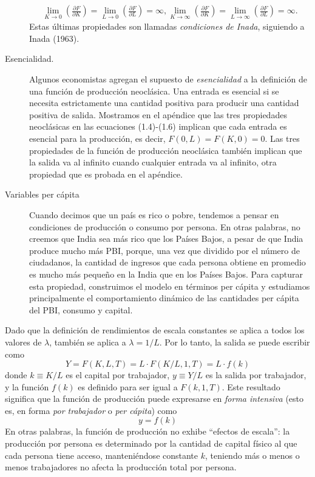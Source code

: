 \begin{description}
\begin{equation}
\begin{split}
\lim\limits_{K\to0}\left(\frac{\partial F}{\partial K}\right)=\lim\limits_{L\to0}\left(\frac{\partial F}{\partial L}\right)=\infty,
\lim\limits_{K\to\infty}\left(\frac{\partial F}{\partial K}\right)=\lim\limits_{L\to\infty}\left(\frac{\partial F}{\partial L}\right)=\infty.
\end{split}
\end{equation}
Estas últimas propiedades son llamadas \emph{condiciones de Inada}, siguiendo a Inada (1963).
\item[Esencialidad.] Algunos economistas agregan el supuesto de \emph{esencialidad} a la definición de una función de producción neoclásica. Una entrada es esencial si se necesita estrictamente una cantidad positiva para producir una cantidad positiva de salida. Mostramos en el apéndice que las tres propiedades neoclásicas en las ecuaciones (1.4)-(1.6) implican que cada entrada es esencial para la producción, es decir, $F\left(0,L\right)=F\left(K,0\right)=0$. Las tres propiedades de la función de producción neoclásica también implican que la salida va al infinito cuando cualquier entrada va al infinito, otra propiedad que es probada en el apéndice.
\end{description}

\begin{description}
	\item[Variables per cápita] Cuando decimos que un país es rico o pobre, tendemos a pensar en condiciones de producción o consumo por persona. En otras palabras, no creemos que India sea más rico que los Países Bajos, a pesar de que India produce mucho más PBI, porque, una vez que dividido por el número de ciudadanos, la cantidad de ingresos que cada persona obtiene en promedio es mucho más pequeño en la India que en los Países Bajos. Para capturar esta propiedad, construimos el modelo en términos per cápita y estudiamos principalmente el comportamiento dinámico de las cantidades per cápita del PBI, consumo y capital.
\end{description}

Dado que la definición de rendimientos de escala constantes se aplica a todos los valores de $\lambda$, también se aplica a $\lambda=1/L$. Por lo tanto, la salida se puede escribir como
\begin{equation}
Y=F\left(K,L,T\right)=L\cdot F\left(K/L,1,T\right)=L\cdot f\left(k\right)
\end{equation}
donde $k\equiv K/L$ es el capital por trabajador, $y\equiv Y/L$ es la salida por trabajador, y la función $f\left(k\right)$ es definido para ser igual a $F\left(k,1,T\right)$. Este resultado significa que la función de producción puede expresarse en \emph{forma intensiva} (esto es, en forma \emph{por trabajador} o \emph{per cápita}) como
\begin{equation}
y=f\left(k\right)
\end{equation}
En otras palabras, la función de producción no exhibe ``efectos de escala'': la producción por persona es determinado por la cantidad de capital físico al que cada persona tiene acceso, manteniéndose constante $k$, teniendo más o menos o menos trabajadores no afecta la producción total por persona.


